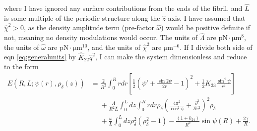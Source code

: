 \documentclass[12pt]{article}
\begin{document}
where I have ignored any surface contributions from the ends of the fibril, and $\hat{L}$ is some multiple of the periodic structure along the $\hat{z}$ axis. I have assumed that $\hat{\chi}^2>0$, as the density amplitude term (pre-factor $\hat{\omega}$) would be positive definite if not, meaning no density modulations would occur. The units of $\hat{\Lambda}$ are $\si{\pico\newton\cdot\micro\meter^8}$, the units of $\hat{\omega}$ are $\si{\pico\newton\cdot\micro\meter^{10}}$, and the units of $\hat{\chi}^2$ are $\si{\micro\meter^{-6}}$. If I divide both side of eqn \ref{eq:generalunits} by $\hat{K}_{22}\hat{q}^2$, I can make the system dimensionless and reduce to the form
\begin{align}\label{eq:general}
E(R,L;\psi(r),\rho_{\delta}(z))&=\frac{2}{R^2}\int_0^{R}rdr\left[\frac{1}{2}\left(\psi'+\frac{\sin2\psi}{2r}-1\right)^2+\frac{1}{2}K_{33}\frac{\sin^4\psi}{r^2}\right]\nonumber\\
&\phantom{=}+\frac{\Lambda}{R^2L}\int_0^{L}dz\int_0^{R}rdr\rho_{\delta}\left(\frac{4\pi^2}{\cos^2\psi}+\frac{\partial^2}{\partial z^2}\right)^2\rho_{\delta}\nonumber\\
&\phantom{=}+\frac{\omega}{L}\int_0^{L}dz\rho_{\delta}^2\left(\rho_{\delta}^2-1\right)-\frac{(1+k_{24})}{R^2}\sin\psi(R)+\frac{2\gamma}{R}.
\end{align}
\end{document}
